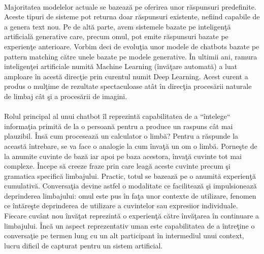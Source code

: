 \paragraph{}
Majoritatea modelelor actuale se bazeaz\u a pe oferirea unor r\u aspunsuri predefinite. Aceste tipuri de sisteme pot returna doar r\u aspunsuri existente, nefiind capabile de a genera text nou. Pe de alt\u a parte, avem sistemele bazate pe inteligen\c t\u a artificial\u a generative care, precum omul, pot emite r\u aspunsuri bazate pe experien\c te anterioare. Vorbim deci de evolu\c tia unor modele de chatbots bazate pe pattern matching c\u atre unele bazate pe modele generative. \^ In ultimii ani, ramura inteligen\c tei artificiale numit\u a Machine Learning  (\^ inv\u a\c tare automat\u a) a luat amploare \^ in acest\u a direc\c tie prin curentul numit Deep Learning. Acest curent a produs o mul\c time de rezultate spectaculoase at\^ at \^ in direc\c tia proces\u arii naturale de limbaj c\^ at \c si a proces\u arii de imagini. 

\paragraph{}
Rolul principal al unui chatbot \^ il reprezint\u a capabilitatea de a ``\^ intelege`` informa\c tia primit\u a de la o persoan\u a pentru a produce un raspuns c\^ at mai plauzibil. \^ Ins\u a cum proceseaz\u a un calculator o limb\u a? Pentru a r\u aspunde la aceast\u a \^ intrebare, se va face o analogie la cum \^ inva\c t\u a un om o limb\u a. Porne\c ste de la anumite cuvinte de baz\u a iar apoi pe baza acestora, \^ inva\c t\u a cuvinte tot mai complexe. \^ Incepe s\u a creeze fraze prin care leag\u a aceste cuvinte precum \c si gramatica specific\u a limbajului. Practic, totul se bazeaz\u a pe o anumit\u a experien\c t\u a cumulativ\u a. Conversa\c tia devine astfel o modalitate ce faciliteaz\u a \c si impulsioneaz\u a deprinderea limbajului: omul este pus \^ in fa\c ta unor contexte de utilizare, fenomen ce \^ int\u are\c ste deprinderea de utilizare a cuvintelor sau expresiior individuale. Fiecare cuv\^ ant nou \^ inv\u a\c tat reprezint\u a o experien\c t\u a c\u atre \^ inv\u a\c tarea \^ in continuare a limbajului. \^ Inc\u a un aspect reprezentativ uman este capabilitatea de a \^ intre\c tine o conversa\c tie pe termen lung cu un alt participant \^ in intermediul unui context, lucru dificil de capturat pentru un sistem artificial.

